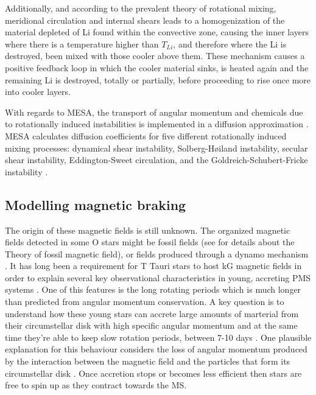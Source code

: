 \documentclass[fleqn,usenatbib]{mnras}
\begin{document}
Additionally, and according to the prevalent theory of rotational mixing, meridional circulation and internal shears leads to a homogenization of the material depleted of Li found within the convective zone, causing the inner layers where there is a temperature higher than $T_{Li}$, and therefore where the Li is destroyed, been mixed with those cooler above them. These mechanism causes a positive feedback loop in which the cooler material sinks, is heated again and the remaining Li is destroyed, totally or partially, before proceeding to rise once more into cooler layers. \par

With regards to MESA, the transport of angular momentum and chemicals due to rotationally induced instabilities is implemented in a diffusion approximation \citet{Endal1978}. MESA calculates diffusion coefficients for five different rotationally induced mixing processes: dynamical shear instability, Solberg-H{\o}iland instability, secular shear instability, Eddington-Sweet circulation, and the Goldreich-Schubert-Fricke instability \citep{Paxton2013}. 

\subsection{Modelling magnetic braking}
The origin of these magnetic fields is still unknown. The organized magnetic fields detected in some O stars \citep{Wade2010} might be fossil fields (see \citet{Dudorov2014} for details about the Theory of fossil magnetic field), or fields produced through a dynamo mechanism \citep{Cantiello2009}. It has long been a requirement for T Tauri stars to host kG magnetic fields \citep{Hussain2014} in order to explain several key observational characteristics in young, accreting PMS systems \citep{Johns-Krull2007}. One of this features is the long rotating periods  which is much longer than predicted from angular momentum conservation.  A key question is to understand how these young stars can accrete large amounts of marterial from their circumstellar disk with high specific angular momentum and at the same time they're able to keep slow rotation periods, between 7-10 days \citep{Hussain2014}. One plausible explanation for this behaviour considers the loss of angular momentum produced by the interaction between the magnetic field and the particles that form its circumstellar disk \citep{Zanni2012}. Once accretion stops or becomes less efficient then stars are free to spin up as they contract towards the MS.\par
\end{document}

